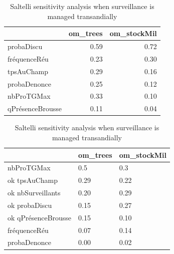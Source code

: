 \documentclass{article}
\begin{document}
        
        \begin{table}[ht]
            \centering
            \hspace*{-1cm}
            \small
            \begin{minipage}{.45\linewidth}
                \centering
                \begingroup\fontsize{10}{12}\selectfont
                \begin{tabular}[]{lrr}
                    \toprule
                    ~ & om\_trees & om\_stockMil\\
                    \hline
                    \addlinespace
                    probaDiscu & 0.59 & 0.72\\
                    fréquenceRéu & 0.23 & 0.30\\
                    tpsAuChamp & 0.29 & 0.16\\
                    probaDenonce & 0.25 & 0.12\\
                    nbProTGMax & 0.33 & 0.10\\
                    qPrésenceBrousse & 0.11 & 0.04\\
                    \bottomrule
                \end{tabular}
                \caption{Saltelli sensitivity analysis when surveillance is delegated to the community}
                \label{tab:saltelliCom}
                \endgroup{}
            \end{minipage}\hfill
            \begin{minipage}{.45\linewidth}
                \centering
                \small
                \begingroup\fontsize{10}{12}\selectfont
                \begin{tabular}[]{lll}
                    \toprule
                    ~ & om\_trees & om\_stockMil\\
                    \hline
                    \addlinespace
                    nbProTGMax & 0.5 & 0.3\\ ok
                    tpsAuChamp & 0.29 & 0.22\\ ok
                    nbSurveillants & 0.20 & 0.29\\ ok
                    probaDiscu & 0.15 & 0.27\\ ok
                    qPrésenceBrousse & 0.15 & 0.10\\
                    fréquenceRéu & 0.07 & 0.14\\
                    probaDenonce & 0.00 & 0.02\\
                    \bottomrule
                \end{tabular}
                \caption{Saltelli sensitivity analysis when surveillance is managed transandially}
                \label{tab:saltelliReprz}
                \endgroup{}
            \end{minipage}
        \end{table}
        
\end{document}
